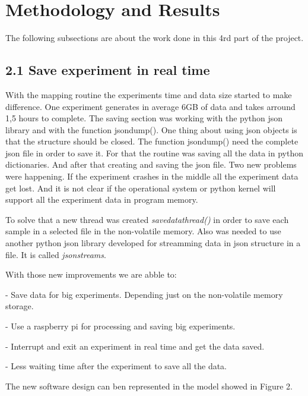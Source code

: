 \section{Methodology and Results}

    The following subsections are about the work done in this 4rd part of the project.


\subsection*{2.1 Save experiment in real time}

    With the mapping routine the experiments time and data size started to make difference.
    One experiment generates in average 6GB of data and takes arround 1,5 hours to complete.
    The saving section was working with the python json library and with the function json\textunderscore{}dump().
    One thing about using json objects is that the structure should be closed.
    The function json\textunderscore{}dump() need the complete json file in order to save it.
    For that the routine was saving all the data in python dictionaries. And after that creating and saving the json file.
    Two new problems were happening. If the experiment crashes in the middle all the experiment data get lost. 
    And it is not clear if the operational system or python kernel will support all the experiment data in program memory.

    To solve that a new thread was created \emph{save\textunderscore{}data\textunderscore{}thread()} in order to save each sample in a selected file in the non-volatile memory.
    Also was needed to use another python json library developed for streamming data in json structure in a file. It is called \emph{jsonstreams}.
    
    With those new improvements we are abble to:
        
        - Save data for big experiments. Depending just on the non-volatile memory storage.
        
        - Use a raspberry pi for processing and saving big experiments.

        - Interrupt and exit an experiment in real time and get the data saved.

        - Less waiting time after the experiment to save all the data.


    The new software design can ben represented in the model showed in Figure 2.


